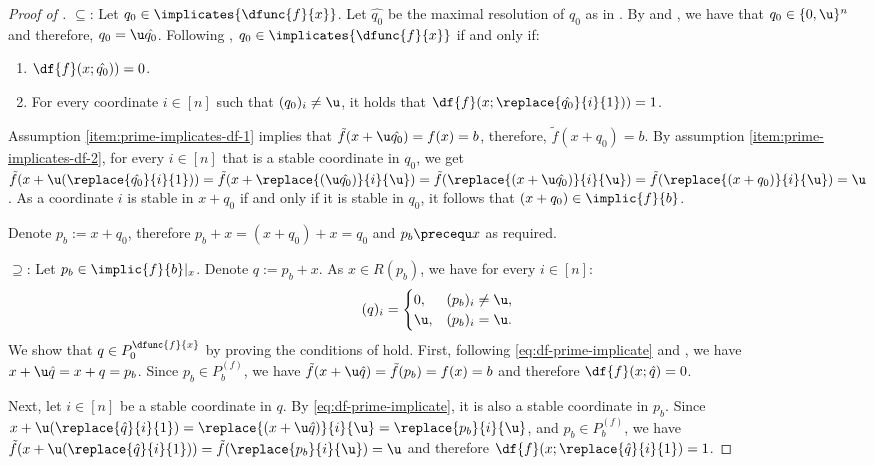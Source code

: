 \documentclass[acmsmall, nonacm, authorversion]{acmart}
\begin{document}
\begin{proof}[Proof of ]
$\subseteq$: Let $q_{0} \in \implicates{\dfunc{f}{x}}$. Let $\hat{q_0}$ be the maximal resolution of $q_0$ as in . By  and , we have that $q_0\in \{0,\u\}^n$ and therefore, $q_0=\u \hat{q_0}$. 
Following , $q_{0} \in \implicates{\dfunc{f}{x}}$ if and only if:
\begin{enumerate}
    \item $\df{f}(x;\hat{q_0}))=0$. \label{item:prime-implicates-df-1}
    \item For every coordinate $i\in[n]$ such that $(q_0)_i\neq \u$, it holds that $\df{f}(x;\replace{\hat{q_0}}{i}{1}))=1$. \label{item:prime-implicates-df-2}
\end{enumerate}

Assumption \ref{item:prime-implicates-df-1} implies that $\tilde{f}(x+\u\hat{q_0})=f(x)=b$, therefore, $\tilde{f}(x+q_0)=b$. By assumption \ref{item:prime-implicates-df-2}, for every $i\in [n]$ that is a stable coordinate in $q_0$, we get  $\tilde{f}(x+\u(\replace{\hat{q_0}}{i}{1}))=\tilde{f}(x+\replace{(\u\hat{q_0})}{i}{\u})=\tilde{f}(\replace{(x+\u\hat{q_0})}{i}{\u})=\tilde{f}(\replace{(x+q_0)}{i}{\u})=\u$.
As a coordinate $i$ is stable in $x+q_0$ if and only if it is stable in $q_0$, it follows that $(x+q_0) \in \implic{f}{b}$. 

Denote $p_b:=x+q_0$, therefore $p_b+x=(x+q_0)+x=q_0$ and $p_b \precequ x$ as required.

$\supseteq$: Let $p_{b} \in \implic{f}{b}|_x$. Denote $q:= p_b+x$. As $x\in R(p_b)$, we have for every $i\in [n]$:
\begin{equation}\label{eq:df-prime-implicate}
    (q)_{i}=\begin{cases}
        0, & (p_{b})_{i}\neq \u,\\
        \u, & (p_{b})_{i}=\u.
    \end{cases}
\end{equation}
We show that $q \in P_0^{\dfunc{f}{x}}$ by proving the conditions of  hold. First, following \eqref{eq:df-prime-implicate} and , we have $x+\u\hat{q}=x+q=p_b$. Since $p_b\in P_b^{(f)}$, we have $\tilde{f}(x+\u\hat{q})=\tilde{f}(p_b)=f(x)=b$ and therefore $\df{f}(x;\hat{q})=0$. 

Next, let $i\in [n]$ be a stable coordinate in $q$. By \eqref{eq:df-prime-implicate}, it is also a stable coordinate in $p_b$. Since $x+\u(\replace{\hat{q}}{i}{1})=\replace{(x+\u\hat{q})}{i}{\u}=\replace{p_b}{i}{\u}$, and $p_b\in P_b^{(f)}$, we have $\tilde{f}(x+\u(\replace{\hat{q}}{i}{1}))=\tilde{f}(\replace{p_b}{i}{\u})=\u$ and therefore $\df{f}(x;\replace{\hat{q}}{i}{1})=1$.  
\end{proof}
\end{document}
